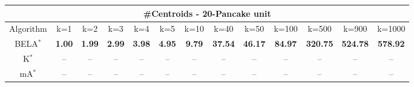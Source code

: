 \begin{tabular}{c|cccccccccccc}\toprule
\multicolumn{13}{c}{#Centroids - 20-Pancake unit}\\ \midrule
Algorithm & k=1 & k=2 & k=3 & k=4 & k=5 & k=10 & k=40 & k=50 & k=100 & k=500 & k=900 & k=1000 \\ \midrule
BELA$^*$ & \textbf{1.00} & \textbf{1.99} & \textbf{2.99} & \textbf{3.98} & \textbf{4.95} & \textbf{9.79} & \textbf{37.54} & \textbf{46.17} & \textbf{84.97} & \textbf{320.75} & \textbf{524.78} & \textbf{578.92} \\
K$^*$ & -- & -- & -- & -- & -- & -- & -- & -- & -- & -- & -- & -- \\
mA$^*$ & -- & -- & -- & -- & -- & -- & -- & -- & -- & -- & -- & -- \\ \bottomrule 
\end{tabular}
